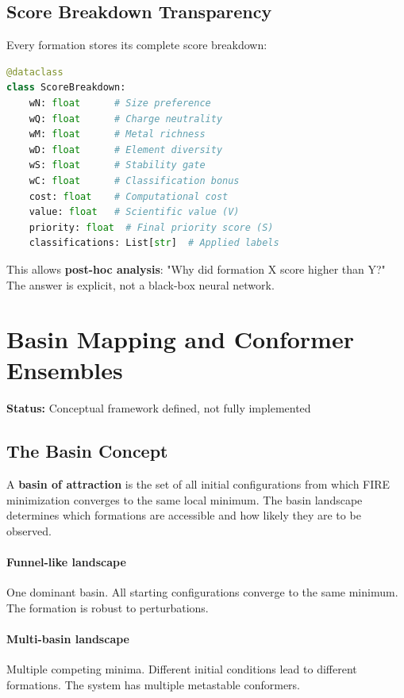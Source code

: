 \documentclass[11pt]{article}
\begin{document}
\subsection{Score Breakdown Transparency}

Every formation stores its complete score breakdown:

\begin{lstlisting}[language=Python]
@dataclass
class ScoreBreakdown:
    wN: float      # Size preference
    wQ: float      # Charge neutrality
    wM: float      # Metal richness
    wD: float      # Element diversity
    wS: float      # Stability gate
    wC: float      # Classification bonus
    cost: float    # Computational cost
    value: float   # Scientific value (V)
    priority: float  # Final priority score (S)
    classifications: List[str]  # Applied labels
\end{lstlisting}

This allows \textbf{post-hoc analysis}: "Why did formation X score higher than Y?" The answer is explicit, not a black-box neural network.

\section{Basin Mapping and Conformer Ensembles}

\textbf{Status:} Conceptual framework defined, not fully implemented

\subsection{The Basin Concept}

A \textbf{basin of attraction} is the set of all initial configurations from which FIRE minimization converges to the same local minimum. The basin landscape determines which formations are accessible and how likely they are to be observed.

\paragraph{Funnel-like landscape} One dominant basin. All starting configurations converge to the same minimum. The formation is robust to perturbations.

\paragraph{Multi-basin landscape} Multiple competing minima. Different initial conditions lead to different formations. The system has multiple metastable conformers.
\end{document}
